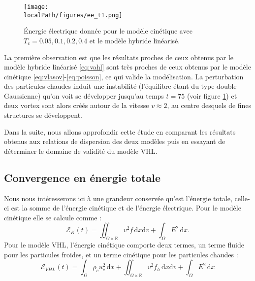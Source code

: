 \begin{figure}[h]
  \centering
  \texttt{[image: \\localPath/figures/ee\_t1.png]}
  \caption{Énergie électrique donnée pour le modèle cinétique avec $T_c=0.05,0.1,0.2,0.4$ et le modèle hybride linéarisé.}
  \label{fig:limit_ee_Tf300}
\end{figure}
La première observation est que les résultats proches de ceux obtenus par le modèle hybride linéarisé \eqref{eq:vahl} sont très proches de ceux obtenus par le modèle cinétique \eqref{eq:vlasov}-\eqref{eq:poisson}, ce qui valide la modélisation. La perturbation des particules chaudes induit une instabilité (l'équilibre étant du type double Gaussienne) qu'on voit se développer jusqu'au temps $t=75$ (voir figure \ref{fig:limit_ee_Tf300}) et deux vortex sont alors créés autour de la vitesse $v\approx 2$, au centre desquels de fines structures se développent. 

Dans la suite, nous allons approfondir cette étude en comparant les résultats obtenus aux relations de dispersion des deux modèles puis en essayant de déterminer le domaine de validité du modèle VHL.  


\FloatBarrier
\subsection{Convergence en énergie totale}

Nous nous intéresserons ici à une grandeur conservée qu'est l'énergie totale, celle-ci est la somme de l'énergie cinétique et de l'énergie électrique. Pour le modèle cinétique elle se calcule comme :
$$
  \mathcal{E}_K(t) = \iint_{\Omega\times\mathbb{R}} v^2 f\,\mathrm{d}x\mathrm{d}v + \int_{\Omega} E^2\,\mathrm{d}x. 
$$
Pour le modèle VHL, l'énergie cinétique comporte deux termes, un terme fluide pour les particules froides, et un terme cinétique pour les particules chaudes :
$$
  \mathcal{E}_{VHL}(t) = \int_\Omega \rho_c u_c^2\,\mathrm{d}x + \iint_{\Omega\times\mathbb{R}}v^2f_h\,\mathrm{d}x\mathrm{d}v + \int_\Omega E^2\,\mathrm{d}x
$$

